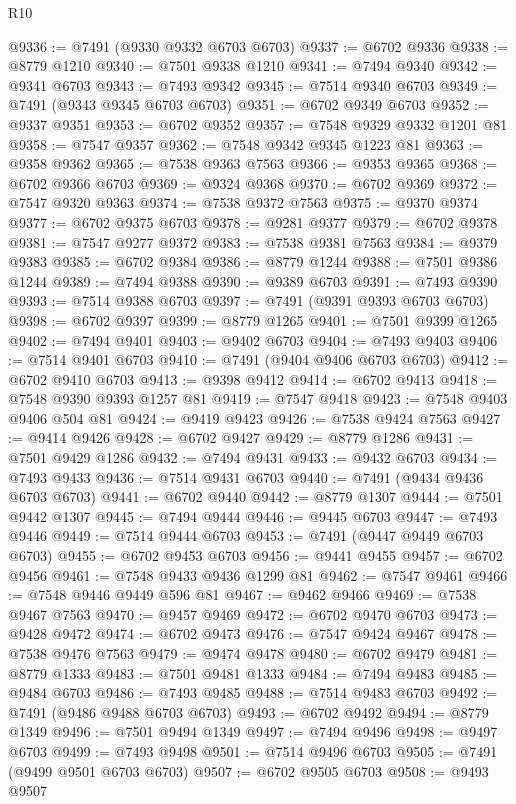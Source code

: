 \begin{lexlean}{R10}
\begin{coremodule}
@9336 := @7491 (@9330 @9332 @6703 @6703)
@9337 := @6702 @9336
@9338 := @8779 @1210
@9340 := @7501 @9338 @1210
@9341 := @7494 @9340
@9342 := @9341 @6703
@9343 := @7493 @9342
@9345 := @7514 @9340 @6703
@9349 := @7491 (@9343 @9345 @6703 @6703)
@9351 := @6702 @9349 @6703
@9352 := @9337 @9351
@9353 := @6702 @9352
@9357 := @7548 @9329 @9332 @1201 @81
@9358 := @7547 @9357
@9362 := @7548 @9342 @9345 @1223 @81
@9363 := @9358 @9362
@9365 := @7538 @9363 @7563
@9366 := @9353 @9365
@9368 := @6702 @9366 @6703
@9369 := @9324 @9368
@9370 := @6702 @9369
@9372 := @7547 @9320 @9363
@9374 := @7538 @9372 @7563
@9375 := @9370 @9374
@9377 := @6702 @9375 @6703
@9378 := @9281 @9377
@9379 := @6702 @9378
@9381 := @7547 @9277 @9372
@9383 := @7538 @9381 @7563
@9384 := @9379 @9383
@9385 := @6702 @9384
@9386 := @8779 @1244
@9388 := @7501 @9386 @1244
@9389 := @7494 @9388
@9390 := @9389 @6703
@9391 := @7493 @9390
@9393 := @7514 @9388 @6703
@9397 := @7491 (@9391 @9393 @6703 @6703)
@9398 := @6702 @9397
@9399 := @8779 @1265
@9401 := @7501 @9399 @1265
@9402 := @7494 @9401
@9403 := @9402 @6703
@9404 := @7493 @9403
@9406 := @7514 @9401 @6703
@9410 := @7491 (@9404 @9406 @6703 @6703)
@9412 := @6702 @9410 @6703
@9413 := @9398 @9412
@9414 := @6702 @9413
@9418 := @7548 @9390 @9393 @1257 @81
@9419 := @7547 @9418
@9423 := @7548 @9403 @9406 @504 @81
@9424 := @9419 @9423
@9426 := @7538 @9424 @7563
@9427 := @9414 @9426
@9428 := @6702 @9427
@9429 := @8779 @1286
@9431 := @7501 @9429 @1286
@9432 := @7494 @9431
@9433 := @9432 @6703
@9434 := @7493 @9433
@9436 := @7514 @9431 @6703
@9440 := @7491 (@9434 @9436 @6703 @6703)
@9441 := @6702 @9440
@9442 := @8779 @1307
@9444 := @7501 @9442 @1307
@9445 := @7494 @9444
@9446 := @9445 @6703
@9447 := @7493 @9446
@9449 := @7514 @9444 @6703
@9453 := @7491 (@9447 @9449 @6703 @6703)
@9455 := @6702 @9453 @6703
@9456 := @9441 @9455
@9457 := @6702 @9456
@9461 := @7548 @9433 @9436 @1299 @81
@9462 := @7547 @9461
@9466 := @7548 @9446 @9449 @596 @81
@9467 := @9462 @9466
@9469 := @7538 @9467 @7563
@9470 := @9457 @9469
@9472 := @6702 @9470 @6703
@9473 := @9428 @9472
@9474 := @6702 @9473
@9476 := @7547 @9424 @9467
@9478 := @7538 @9476 @7563
@9479 := @9474 @9478
@9480 := @6702 @9479
@9481 := @8779 @1333
@9483 := @7501 @9481 @1333
@9484 := @7494 @9483
@9485 := @9484 @6703
@9486 := @7493 @9485
@9488 := @7514 @9483 @6703
@9492 := @7491 (@9486 @9488 @6703 @6703)
@9493 := @6702 @9492
@9494 := @8779 @1349
@9496 := @7501 @9494 @1349
@9497 := @7494 @9496
@9498 := @9497 @6703
@9499 := @7493 @9498
@9501 := @7514 @9496 @6703
@9505 := @7491 (@9499 @9501 @6703 @6703)
@9507 := @6702 @9505 @6703
@9508 := @9493 @9507

\end{coremodule}
\end{lexlean}

